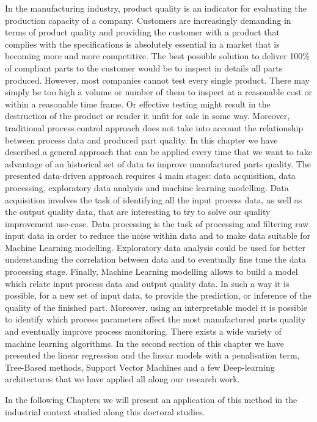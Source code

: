 In the manufacturing industry, product quality is an indicator for evaluating the production capacity of a company. Customers are increasingly demanding in terms of product quality and providing the customer with a product that complies with the specifications is absolutely essential in a market that is becoming more and more competitive. The best possible solution to deliver 100\% of compliant parts to the customer would be to inspect in details all parts produced. However, most companies cannot test every single product. There may simply be too high a volume or number of them to inspect at a reasonable cost or within a reasonable time frame. Or effective testing might result in the destruction of the product or render it unfit for sale in some way. Moreover, traditional process control approach does not take into account the relationship between process data and produced part quality. In this chapter we have described a general approach that can be applied every time that we want to take advantage of an historical set of data to improve manufactured parts quality. The presented data-driven approach requires 4 main stages: data acquisition, data processing, exploratory data analysis and machine learning modelling. Data acquisition involves the task of identifying all the input process data, as well as the output quality data, that are interesting to try to solve our quality improvement use-case. Data processing is the task of processing and filtering raw input data in order to reduce the noise within data and to make data suitable for Machine Learning modelling. Exploratory data analysis could be used for better understanding the correlation between data and to eventually fine tune the data processing stage. Finally, Machine Learning modelling allows to build a model which relate input process data and output quality data. In such a way it is possible, for a new set of input data, to provide the prediction, or inference of the quality of the finished part. Moreover, using an interpretable model it is possible to identify which process parameters affect the most manufactured parts quality and eventually improve process monitoring. There exists a wide variety of machine learning algorithms. In the second section of this chapter we have presented the linear regression and the linear models with a penalisation term, Tree-Based methods, Support Vector Machines and a few Deep-learning architectures that we have applied all along our research work.

In the following Chapters we will present an application of this method in the industrial context studied along this doctoral studies.


